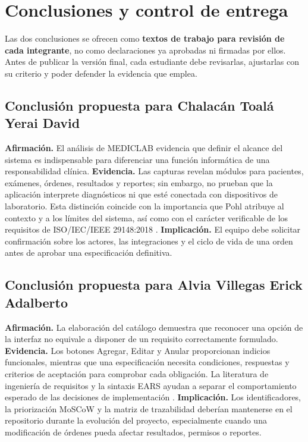 
\section{Conclusiones y control de entrega}
Las dos conclusiones se ofrecen como \textbf{textos de trabajo para revisión de cada integrante}, no como declaraciones ya aprobadas ni firmadas por ellos. Antes de publicar la versión final, cada estudiante debe revisarlas, ajustarlas con su criterio y poder defender la evidencia que emplea.

\subsection{Conclusión propuesta para Chalacán Toalá Yerai David}
\textbf{Afirmación.} El análisis de MEDICLAB evidencia que definir el alcance del sistema es indispensable para diferenciar una función informática de una responsabilidad clínica. \textbf{Evidencia.} Las capturas revelan módulos para pacientes, exámenes, órdenes, resultados y reportes; sin embargo, no prueban que la aplicación interprete diagnósticos ni que esté conectada con dispositivos de laboratorio. Esta distinción coincide con la importancia que Pohl atribuye al contexto y a los límites del sistema, así como con el carácter verificable de los requisitos de ISO/IEC/IEEE 29148:2018 \cite{pohl2025,iso29148}. \textbf{Implicación.} El equipo debe solicitar confirmación sobre los actores, las integraciones y el ciclo de vida de una orden antes de aprobar una especificación definitiva.

\subsection{Conclusión propuesta para Alvia Villegas Erick Adalberto}
\textbf{Afirmación.} La elaboración del catálogo demuestra que reconocer una opción de la interfaz no equivale a disponer de un requisito correctamente formulado. \textbf{Evidencia.} Los botones Agregar, Editar y Anular proporcionan indicios funcionales, mientras que una especificación necesita condiciones, respuestas y criterios de aceptación para comprobar cada obligación. La literatura de ingeniería de requisitos y la sintaxis EARS ayudan a separar el comportamiento esperado de las decisiones de implementación \cite{iso29148,mavin2009}. \textbf{Implicación.} Los identificadores, la priorización MoSCoW y la matriz de trazabilidad deberían mantenerse en el repositorio durante la evolución del proyecto, especialmente cuando una modificación de órdenes pueda afectar resultados, permisos o reportes.


